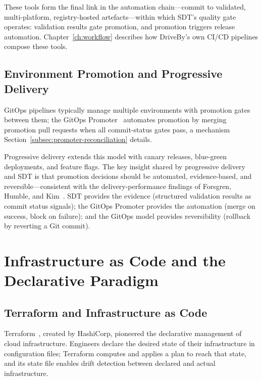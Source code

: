 These tools form the final link in the automation chain---commit to validated, multi-platform, registry-hosted artefacts---within which SDT's quality gate operates: validation results gate promotion, and promotion triggers release automation. Chapter~\ref{ch:workflow} describes how DriveBy's own CI/CD pipelines compose these tools.

\subsection{Environment Promotion and Progressive Delivery}
\label{subsec:env-promotion}

GitOps pipelines typically manage multiple environments with promotion gates between them; the GitOps Promoter~\cite{gitops-promoter} automates promotion by merging promotion pull requests when all commit-status gates pass, a mechanism Section~\ref{subsec:promoter-reconciliation} details.

Progressive delivery extends this model with canary releases, blue-green deployments, and feature flags. The key insight shared by progressive delivery and SDT is that promotion decisions should be automated, evidence-based, and reversible---consistent with the delivery-performance findings of Forsgren, Humble, and Kim~\cite{accelerate}. SDT provides the evidence (structured validation results as commit status signals); the GitOps Promoter provides the automation (merge on success, block on failure); and the GitOps model provides reversibility (rollback by reverting a Git commit).

\section{Infrastructure as Code and the Declarative Paradigm}
\label{sec:iac-declarative}

\subsection{Terraform and Infrastructure as Code}
\label{subsec:terraform-iac}

Terraform~\cite{terraform}, created by HashiCorp, pioneered the declarative management of cloud infrastructure. Engineers declare the desired state of their infrastructure in configuration files; Terraform computes and applies a plan to reach that state, and its state file enables drift detection between declared and actual infrastructure.

